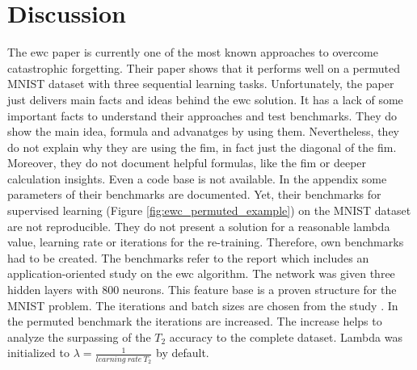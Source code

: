 \chapter{Discussion}

The \acrshort{ewc} paper is currently one of the most known approaches to overcome catastrophic forgetting.
Their paper shows that it performs well on a permuted MNIST dataset with three sequential learning tasks.
\newline
Unfortunately, the paper just delivers main facts and ideas behind the \acrshort{ewc} solution.
It has a lack of some important facts to understand their approaches and test benchmarks.
They do show the main idea, formula and advanatges by using them.
Nevertheless, they do not explain why they are using the \acrshort{fim}, in fact just the diagonal of the \acrshort{fim}.
Moreover, they do not document helpful formulas, like the \acrshort{fim} or deeper calculation insights.
Even a code base is not available.
In the appendix some parameters of their benchmarks are documented.
Yet, their benchmarks for supervised learning (Figure \ref{fig:ewc_permuted_example}) on the MNIST dataset are not reproducible.
They do not present a solution for a reasonable lambda value, learning rate or iterations for the re-training.
Therefore, own benchmarks had to be created.
The benchmarks refer to the report \cite{cf_application_oriented_study} which includes an application-oriented study on the \acrshort{ewc} algorithm.
The network was given three hidden layers with 800 neurons.
This feature base is a proven structure for the MNIST problem.
The iterations and batch sizes are chosen from the study \cite{cf_application_oriented_study}.
In the permuted benchmark the iterations are increased.
The increase helps to analyze the surpassing of the $T_2$ accuracy to the complete dataset.
Lambda was initialized to $\lambda = \frac{1}{learning \: rate \: T_2}$ by default.

